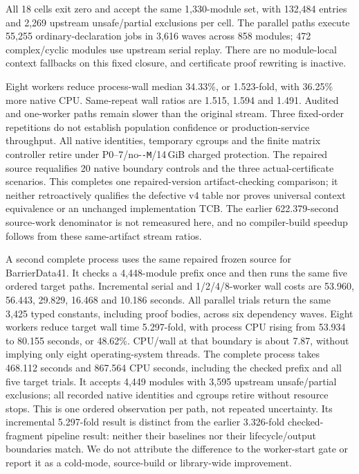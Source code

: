 \documentclass[10pt,twocolumn]{article}
\begin{document}
All 18 cells exit zero and accept the same 1,330-module set, with 132,484
entries and 2,269 upstream unsafe/partial exclusions per cell.
The parallel paths execute 55,255 ordinary-declaration jobs in 3,616 waves
across 858 modules; 472 complex/cyclic modules use upstream serial replay.
There are no module-local context fallbacks on this fixed closure, and
certificate proof rewriting is inactive.

Eight workers reduce process-wall median 34.33\%, or 1.523-fold, with
36.25\% more native CPU.
Same-repeat wall ratios are 1.515, 1.594 and 1.491.
Audited and one-worker paths remain slower than the original stream.
Three fixed-order repetitions do not establish population confidence or
production-service throughput.
All native identities, temporary cgroups and the finite matrix controller
retire under P0--7/no-\texttt{-M}/14\,GiB charged protection.
The repaired source requalifies 20 native boundary controls and the three
actual-certificate scenarios.
This completes one repaired-version artifact-checking comparison; it neither
retroactively qualifies the defective v4 table nor proves universal context
equivalence or an unchanged implementation TCB.
The earlier 622.379-second source-work denominator is not remeasured here,
and no compiler-build speedup follows from these same-artifact stream ratios.

A second complete process uses the same repaired frozen source for
BarrierData41. It checks a 4,448-module prefix once and then runs the same
five ordered target paths.
Incremental serial and 1/2/4/8-worker wall costs are
53.960, 56.443, 29.829, 16.468 and 10.186 seconds.
All parallel trials return the same 3,425 typed constants, including proof
bodies, across six dependency waves.
Eight workers reduce target wall time 5.297-fold, with process CPU rising
from 53.934 to 80.155 seconds, or 48.62\%.
CPU/wall at that boundary is about 7.87, without implying only eight
operating-system threads.
The complete process takes 468.112 seconds and 867.564 CPU seconds,
including the checked prefix and all five target trials.
It accepts 4,449 modules with 3,595 upstream unsafe/partial exclusions;
all recorded native identities and cgroups retire without resource stops.
This is one ordered observation per path, not repeated uncertainty.
Its incremental 5.297-fold result is distinct from the earlier
3.326-fold checked-fragment pipeline result: neither their baselines nor
their lifecycle/output boundaries match.
We do not attribute the difference to the worker-start gate or report it
as a cold-mode, source-build or library-wide improvement.
\end{document}
